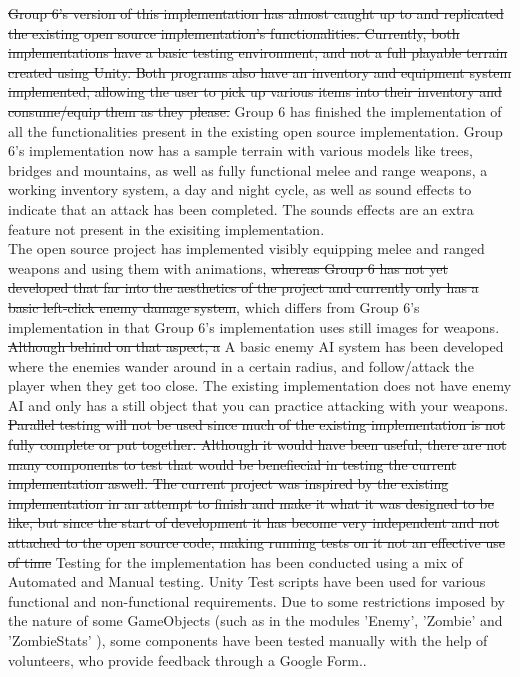 \documentclass[12pt, titlepage]{article}
\DeclareRobustCommand{\hsout}[1]{\texorpdfstring{\sout{#1}}{#1}}
\begin{document}
\hsout{Group 6's version of this implementation has almost caught up to and replicated the existing open source implementation's functionalities. Currently, both implementations have a basic testing environment, and not a full playable terrain created using Unity. Both programs also have an inventory and equipment system implemented, allowing the user to pick up various items into their inventory and consume/equip them as they please.}
{\color{magenta} Group 6 has finished the implementation of all the functionalities present in the existing open source implementation. Group 6's implementation now has a sample terrain with various models like trees, bridges and mountains, as well as fully functional melee and range weapons, a working inventory system, a day and night cycle, as well as sound effects to indicate that an attack has been completed. The sounds effects are an extra feature not present in the exisiting implementation.}\\

The open source project has implemented visibly equipping melee and ranged weapons and using them with animations, \hsout{whereas Group 6 has not yet developed that far into the aesthetics of the project and currently only has a basic left-click enemy damage system}, {\color{magenta}which differs from Group 6's implementation in that Group 6's implementation uses still images for weapons.} \hsout{Although behind on that aspect, a} {\color{magenta}A } basic enemy AI system has been developed where the enemies wander around in a certain radius, and follow/attack the player when they get too close.  The existing implementation does not have enemy AI and only has a still object that you can practice attacking with your weapons. \\

\hsout{Parallel testing will not be used since much of the existing implementation is not fully complete or put together. Although it would have been useful, there are not many components to test that would be benefiecial in testing the current implementation aswell. The current project was inspired by the existing implementation in an attempt to finish and make it what it was designed to be like, but since the start of development it has become very independent and not attached to the open source code, making running tests on it not an effective use of time}
{\color{magenta} Testing for the implementation has been conducted using a mix of Automated and Manual testing. Unity Test scripts have been used for various functional and non-functional requirements. Due to some restrictions imposed by the nature of some GameObjects (such as in the modules 'Enemy', 'Zombie' and 'ZombieStats' ), some components have been tested manually with the help of volunteers, who provide feedback through a Google Form.}.
\end{document}

